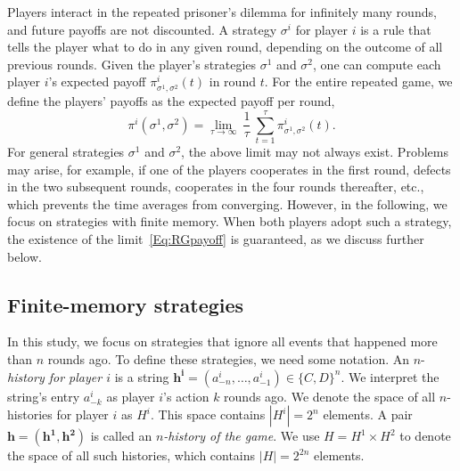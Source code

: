 \documentclass[9pt,twoside,lineno]{pnas-new}
\theoremstyle{plainCl1}
\theoremstyle{plainCl2}
\begin{document}
Players interact in the repeated prisoner's dilemma for infinitely many rounds, and future payoffs are not discounted. 
A strategy $\sigma^i$ for player $i$ is a rule that tells the player what to do in any given round, depending on the outcome of all previous rounds. 
Given the player's strategies $\sigma^1$ and $\sigma^2$, one can compute each player $i$'s expected payoff $\pi^i_{\sigma^1,\sigma^2}(t)$ in round $t$. 
For the entire repeated game, we define the players' payoffs as the expected payoff per round, 
\begin{equation} \label{Eq:RGpayoff}
\pi^i(\sigma^1,\sigma^2) = \lim_{\tau \to \infty}~ \frac{1}{\tau} ~\sum_{t=1}^{\tau} \pi_{\sigma^1,\sigma^2}^i(t).
\end{equation}
For general strategies $\sigma^1$ and $\sigma^2$, the above limit may not always exist. 
Problems may arise, for example, if one of the players cooperates in the first round, defects in the two subsequent rounds, cooperates in the four rounds thereafter, etc., which prevents the time averages from converging. 
However, in the following, we focus on strategies with finite memory. 
When both players adopt such a strategy, the existence of the limit~\eqref{Eq:RGpayoff} is guaranteed, as we discuss further below.


\subsection{Finite-memory strategies} 


In this study, we focus on strategies that ignore all events that happened more than $n$ rounds ago.
To define these strategies, we need some notation. 
An \(n\)-{\it history for player $i$} is a string \(\mathbf{h^i} \!=\! (a^i_{-n}, \ldots, a^i_{-1})\! \in \!\{C, D\}^n\). 
We interpret the string's entry \(a^i_{-k}\) as player \(i\)'s action \(k\) rounds ago. 
We denote the space of all \(n\)-histories for player \(i\) as \(H^i\). 
This space contains \(|H^i| \!=\! 2^n\) elements. 
A pair \(\mathbf{h} \!=\! (\mathbf{h^1}, \mathbf{h^2})\) is called an {\it \(n\)-history of the game}. 
We use \(H \!=\! H^1 \!\times\! H^2\) to denote the space of all such histories, which contains \(|H| \!=\! 2^{2n}\) elements.\\ 
\end{document}
